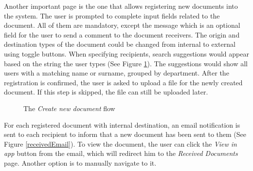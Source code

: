 Another important page is the one that allows registering new documents into the system. The user is prompted to complete input fields related to the document. All of them are mandatory, except the message which is an optional field for the user to send a comment to the document receivers. The origin and destination types of the document could be changed from internal to external using toggle buttons. When specifying recipients, search suggestions would appear based on the string the user types (See Figure \ref{createDocument}). The suggestions would show all users with a matching name or surname, grouped by department. After the registration is confirmed, the user is asked to upload a file for the newly created document. If this step is skipped, the file can still be uploaded later.

\begin{figure}[ht]
    \centering
    \qquad
    \caption{The \textit{Create new document} flow}
    \label{createDocument}
\end{figure}

For each registered document with internal destination, an email notification is sent to each recipient to inform that a new document has been sent to them (See Figure \ref{receivedEmail}). To view the document, the user can click the \textit{View in app} button from the email, which will redirect him to the \textit{Received Documents} page. Another option is to manually navigate to it.

